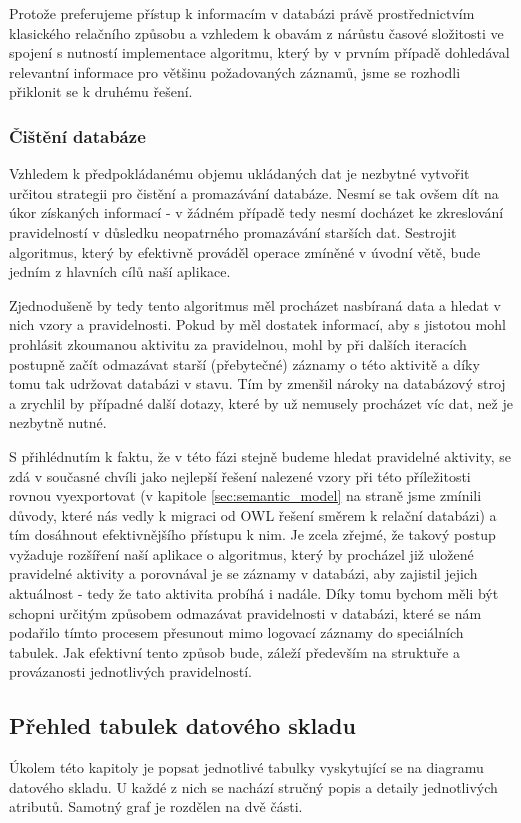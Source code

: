 \documentclass[thesis=M,czech]{FITthesis}[2012/06/26]
\begin{document}
Protože preferujeme přístup k informacím v databázi právě prostřednictvím klasického relačního způsobu a vzhledem k obavám z nárůstu časové složitosti ve spojení s nutností implementace algoritmu, který by v prvním případě dohledával relevantní informace pro většinu požadovaných záznamů, jsme se rozhodli přiklonit se k druhému řešení.

\subsubsection*{Čištění databáze}
Vzhledem k předpokládanému objemu ukládaných dat je nezbytné vytvořit určitou strategii pro čistění a promazávání databáze. Nesmí se tak ovšem dít na úkor získaných informací - v žádném případě tedy nesmí docházet ke zkreslování pravidelností v důsledku neopatrného promazávání starších dat. Sestrojit algoritmus, který by efektivně prováděl operace zmíněné v úvodní větě, bude jedním z hlavních cílů naší aplikace.

Zjednodušeně by tedy tento algoritmus měl procházet nasbíraná data a hledat v nich vzory a pravidelnosti. Pokud by měl dostatek informací, aby s jistotou mohl prohlásit zkoumanou aktivitu za pravidelnou, mohl by při dalších iteracích postupně začít odmazávat starší (přebytečné) záznamy o této aktivitě a díky tomu tak udržovat databázi v  stavu. Tím by zmenšil nároky na databázový stroj a zrychlil by případné další dotazy, které by už nemusely procházet víc dat, než je nezbytně nutné.

S přihlédnutím k faktu, že v této fázi stejně budeme hledat pravidelné aktivity, se zdá v současné chvíli jako nejlepší řešení nalezené vzory při této příležitosti rovnou vyexportovat (v kapitole \ref{sec:semantic_model} na straně \pageref{sec:semantic_model} jsme zmínili důvody, které nás vedly k migraci od OWL řešení směrem k relační databázi) a tím dosáhnout efektivnějšího přístupu k nim. Je zcela zřejmé, že takový postup vyžaduje rozšíření naší aplikace o algoritmus, který by procházel již uložené pravidelné aktivity a porovnával je se záznamy v databázi, aby zajistil jejich aktuálnost - tedy že tato aktivita probíhá i nadále. Díky tomu bychom měli být schopni určitým způsobem odmazávat pravidelnosti v databázi, které se nám podařilo tímto procesem přesunout mimo logovací záznamy do speciálních tabulek. Jak efektivní tento způsob bude, záleží především na struktuře a provázanosti jednotlivých pravidelností.

\subsection{Přehled tabulek datového skladu}
Úkolem této kapitoly je popsat jednotlivé tabulky vyskytující se na diagramu datového skladu. U každé z nich se nachází stručný popis a detaily jednotlivých atributů. Samotný graf je rozdělen na dvě části.
\end{document}
